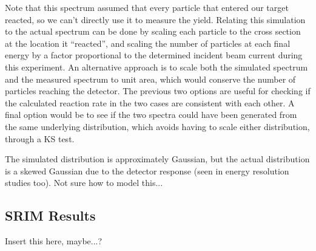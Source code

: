 Note that this spectrum assumed that every particle that entered our
target reacted, so we can't directly use it to measure the yield.
Relating this simulation to the actual spectrum can be done by scaling
each particle to the cross section at the location it ``reacted'', and
scaling the number of particles at each final energy by a factor
proportional to the determined incident beam current during this
experiment. An alternative approach is to scale both the simulated
spectrum and the measured spectrum to unit area, which would conserve
the number of particles reaching the detector. The previous two options
are useful for checking if the calculated reaction rate in the two cases
are consistent with each other. A final option would be to see if the
two spectra could have been generated from the same underlying
distribution, which avoids having to scale either distribution, through
a KS test.

The simulated distribution is approximately Gaussian, but the actual
distribution is a skewed Gaussian due to the detector response (seen in
energy resolution studies too). Not sure how to model this...


\subsection{SRIM Results}

Insert this here, maybe...?
